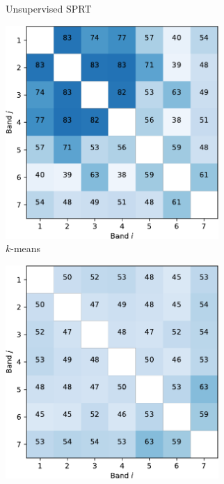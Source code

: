\documentclass{article}
\begin{document}
\begin{figure}[h]
\begin{subfigure}[b]{0.5\linewidth}
    \caption{Unsupervised SPRT} 
    \label{fig7:b} 
    \end{subfigure} 
  \begin{subfigure}[b]{0.5\linewidth}
    \centering
    \includegraphics[width=0.89\textwidth]{kmeans-crop.pdf} 
    \caption{$k$-means} 
    \label{fig7:c} 
  \end{subfigure}%
  \begin{subfigure}[b]{0.5\linewidth}
    \centering
    \includegraphics[width=0.89\textwidth]{gmm-crop.pdf} 

\end{subfigure}
\end{figure}
\end{document}
